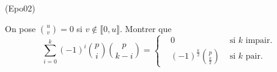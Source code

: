 \begin{tiny}(Epo02)\end{tiny} On pose $\binom{u}{v}=0$ si $v\notin \llbracket 0, u\rrbracket$. Montrer que
\begin{displaymath}
\sum_{i=0}^{k}(-1)^{i}\binom{p}{i}\binom{p}{k-i}
=\left\{
\begin{aligned}
&0                        &\text{ si } k\text{ impair.} \\
&(-1)^{\frac{k}{2}}\binom{p}{\frac{k}{2}} &\text{ si } k\text{ pair.}
\end{aligned}
\right. 
\end{displaymath}
